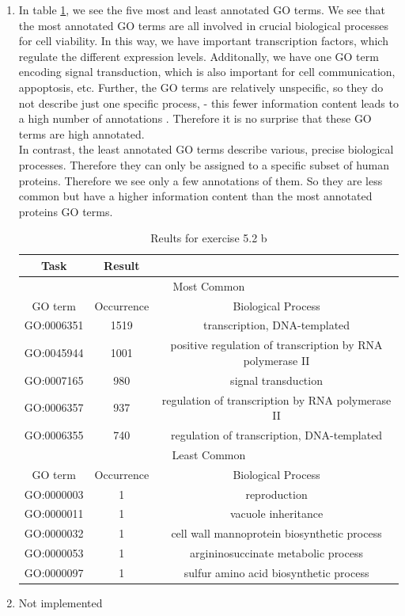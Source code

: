 \documentclass[10pt,a4paper]{article}
\begin{document}
\begin{enumerate}
\item In table \ref{table:ex2c}, we see the five most and least annotated GO terms. We see that the most annotated GO terms are all involved in crucial biological processes for cell viability. In this way, we have important transcription factors, which regulate the different expression levels. Additonally, we have one GO term encoding signal transduction, which is also important for cell communication, appoptosis, etc. Further, the GO terms are relatively unspecific, so they do not describe just one specific process, - this fewer information content leads to a high number of annotations . Therefore it is no surprise that these GO terms are high annotated.\\
In contrast, the least annotated GO terms describe various, precise biological processes. Therefore they can only be assigned to a specific subset of human proteins. Therefore we see only a few annotations of them. So they are less common but have a higher information content than the most annotated proteins GO terms.
\begin{table}[!h]
\caption{Reults for exercise 5.2 b}
\label{table:ex2c}
\begin{tabular}{c c c}
Task & Result\\
\hline
\multicolumn{3}{c}{Most Common}\\
\hline
GO term & Occurrence & Biological Process\\
\hline
GO:0006351 & 1519 &  transcription, DNA-templated\\
GO:0045944 & 1001 &  positive regulation of transcription by RNA polymerase II\\
GO:0007165 & 980 & signal transduction\\
GO:0006357 & 937 &  regulation of transcription by RNA polymerase II\\
GO:0006355 & 740 & regulation of transcription, DNA-templated\\
\hline
\multicolumn{3}{c}{Least Common}\\
\hline
GO term & Occurrence & Biological Process\\
\hline
GO:0000003 & 1 &  reproduction \\
GO:0000011 & 1 & vacuole inheritance\\
GO:0000032 & 1 & cell wall mannoprotein biosynthetic process\\
GO:0000053 & 1 &  argininosuccinate metabolic process \\
GO:0000097 & 1 & sulfur amino acid biosynthetic process\\
\end{tabular}
\end{table}
\item Not implemented


\end{enumerate}
\end{document}
